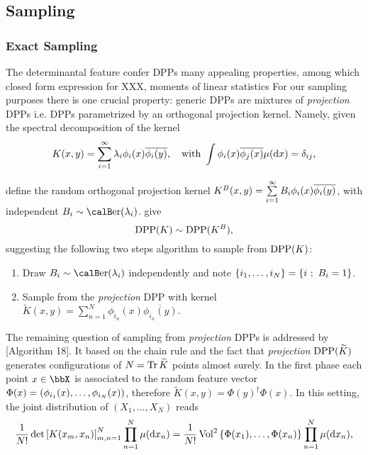 \documentclass[twoside,11pt]{article}
\begin{document}
  \subsection{Sampling} %
  \label{sub:sampling}

    \subsubsection{Exact Sampling} %
    \label{ssub:exact_sampling}

      The determinantal feature confer DPPs many appealing properties, among which closed form expression for XXX, moments of linear statistics \etc
      For our sampling purposes there is one crucial property: generic DPPs are mixtures of \textit{projection} DPPs i.e. DPPs parametrized by an orthogonal projection kernel.
      Namely, given the spectral decomposition of the kernel
      \begin{equation}
      \label{eq:eigdec_kernel}
        K(x,y)=\sum\limits_{i=1}^{\infty} \lambda_i \phi_i(x) \overline{\phi_i(y)},
        \quad \text{with }
        \int \phi_i(x) \overline{\phi_j(x)} \mu(\mathop{}\!\mathrm{d} x) = \delta_{ij},
      \end{equation}

      define the random orthogonal projection kernel
      $
        K^B(x,y)
          = \sum\limits_{i=1}^{\infty} B_i \phi_i(x) \overline{\phi_i(y)}
      $, with independent $B_i\sim\Ber(\lambda_i)$.
      \citet[Theorem 7]{HKPV06} give
      \begin{equation}
        \operatorname{DPP}(K) \sim \operatorname{DPP}(K^B),
      \end{equation}
      suggesting the following two steps algorithm to sample from $\operatorname{DPP}(K)$:
      \begin{enumerate}
        \item Draw $B_i\sim\Ber(\lambda_i)$ independently and note $\left\{ i_1,\dots,i_{N} \right\} = \left\{ i~;~B_i=1 \right\}$.
        \item Sample from the \textit{projection} DPP with kernel $\tilde{K}(x,y) = \sum_{n=1}^{N}\phi_{i_n}(x) \overline{\phi_{i_n}(y)}$.
      \end{enumerate}

      The remaining question of sampling from \textit{projection} DPPs is addressed by \citet{HKPV06}[Algorithm 18].
      It based on the chain rule and the fact that \textit{projection} $\operatorname{DPP}(\widetilde{K})$ generates configurations of $N=\operatorname{Tr} \widetilde{K}$ points almost surely.
      In the first phase each point $x\in \bbX$ is associated to the random feature vector $\Phi(x)=\left( \phi_{i_1}(x),\dots,\phi_{i_N}(x) \right)$, therefore $\tilde{K}(x,y) = \Phi(y)^{\dagger} \Phi(x)$.
      In this setting, the joint distribution of $(X_1,\dots,X_N)$ reads
      \begin{equation}
      \label{eq:joint_distribution}
        \frac{1}{N!} \det \left[ K(x_m,x_n) \right]_{m,n=1}^N \prod_{n=1}^N\mu(\mathop{}\!\mathrm{d} x_n)
          = \frac{1}{N!} \operatorname{Vol}^2\left\{ \Phi(x_1),\dots,\Phi(x_n) \right\} \prod_{n=1}^N\mu(\mathop{}\!\mathrm{d} x_n),
      \end{equation}
\end{document}
